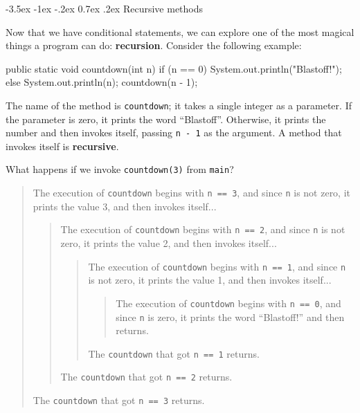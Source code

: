 \documentclass[12pt]{book}
\makeatletter
\theoremstyle{exercise}
\newcommand{\java}[1]{\verb"#1"}
\renewcommand{\section}{\@startsection{section}{1}{\z@}%
    {-3.5ex \@plus -1ex \@minus -.2ex}%
    {0.7ex \@plus.2ex}%
    {\normalfont\Large\bfseries}}
\newcommand{\java}[1]{\lstinline{#1}} %
\makeatother
\begin{document}


\section{Recursive methods}
\label{recursion}


Now that we have conditional statements, we can explore one of the most magical things a program can do: {\bf recursion}.
Consider the following example:

\begin{code}
    public static void countdown(int n) {
        if (n == 0) {
            System.out.println("Blastoff!");
        } else {
            System.out.println(n);
            countdown(n - 1);
        }
    }
\end{code}

The name of the method is \java{countdown}; it takes a single integer as a parameter.
If the parameter is zero, it prints the word ``Blastoff''.
Otherwise, it prints the number and then invokes itself, passing \java{n - 1} as the argument.
A method that invokes itself is {\bf recursive}.

What happens if we invoke \java{countdown(3)} from \java{main}?

\vspace{-1ex}
\begin{quote}
The execution of \java{countdown} begins with \java{n == 3}, and since \java{n} is not zero, it prints the value 3, and then invokes itself...
\begin{quote}
The execution of \java{countdown} begins with \java{n == 2}, and since \java{n} is not zero, it prints the value 2, and then invokes itself...
\begin{quote}
The execution of \java{countdown} begins with \java{n == 1}, and since \java{n} is not zero, it prints the value 1, and then invokes itself...
\begin{quote}
The execution of \java{countdown} begins with \java{n == 0}, and since \java{n} is zero, it prints the word ``Blastoff!'' and then returns.
\end{quote}
The \java{countdown} that got \java{n == 1} returns.
\end{quote}
The \java{countdown} that got \java{n == 2} returns.
\end{quote}
The \java{countdown} that got \java{n == 3} returns.
\end{quote}
\vspace{-1ex}
\end{document}
